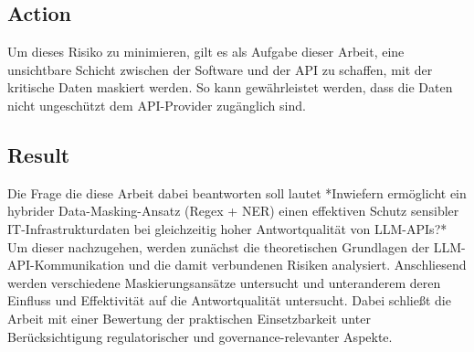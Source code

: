 \subsection{Action}
Um dieses Risiko zu minimieren, gilt es als Aufgabe dieser Arbeit, eine unsichtbare Schicht zwischen der Software und der API zu schaffen,
mit der kritische Daten maskiert werden. So kann gewährleistet werden, dass die Daten nicht ungeschützt dem API-Provider zugänglich sind.

\subsection{Result}
Die Frage die diese Arbeit dabei beantworten soll lautet *Inwiefern ermöglicht ein hybrider Data-Masking-Ansatz (Regex + NER) einen effektiven Schutz sensibler IT-Infrastrukturdaten bei gleichzeitig hoher Antwortqualität von LLM-APIs?*
Um dieser nachzugehen, werden zunächst die theoretischen Grundlagen der LLM-API-Kommunikation und die damit verbundenen Risiken analysiert.
Anschliesend werden verschiedene Maskierungsansätze untersucht und unteranderem deren Einfluss und Effektivität auf die Antwortqualität untersucht.
Dabei schließt die Arbeit mit einer Bewertung der praktischen Einsetzbarkeit unter Berücksichtigung regulatorischer und governance-relevanter Aspekte.
